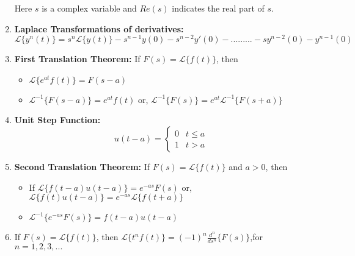 \documentclass[11pt,oneside,openright,numbers=noenddot]{scrbook}
\begin{document}
\begin{enumerate}
\begin{table}[ht!]
\begin{tabular}{|c|c|}
             \hline
        \end{tabular}
    \end{table}
    \FloatBarrier
    Here $s$ is a complex variable and $Re(s)$ indicates the real part of $s$. 
    \item \textbf{Laplace Transformations of derivatives:} 
    $$\mathcal{L} \{y^n(t)\}=s^n\mathcal{L} \{y(t)\}-s^{n-1}y(0)-s^{n-2}y'(0)- ......... -sy^{n-2}(0)-y^{n-1}(0)$$
    \item \textbf{First Translation Theorem:}
    If $F(s)=\mathcal{L} \{f(t)\}$, then
    \begin{itemize}
        \item $\displaystyle \mathcal{L} \{e^{at}f(t)\}=F(s-a)$
        \item $\displaystyle \mathcal{L}^{-1}\{F(s-a)\} =e^{at}f(t)$ \quad  or, \quad $\displaystyle \mathcal{L}^{-1}\{F(s)\} =e^{at}\mathcal{L}^{-1}\{F(s+a)\}$
    \end{itemize}
    \item \textbf{Unit Step Function:} $$u(t-a)=\begin{cases}
        0 & t \leq a\\
        1 & t>a
    \end{cases}$$
    \item \textbf{Second Translation Theorem:} If $F(s)=\mathcal{L} \{f(t)\}$ and $a>0$, then
    \begin{itemize}
        \item If $\displaystyle \mathcal{L} \{f(t-a)u(t-a)\}=e^{-as}F(s)$ 
        \quad or, \quad $\displaystyle \mathcal{L} \{f(t)u(t-a)\}=e^{-as}\mathcal{L} \{f(t+a)\}$
        \item $\displaystyle \mathcal{L}^{-1} \{e^{-as}F(s)\}=f(t-a)u(t-a)$
    \end{itemize}
    \item If $F(s)=\mathcal{L} \{f(t)\}$, then $\displaystyle \mathcal{L} \{t^n f(t)\}=(-1)^n \frac{d^n}{ds^n}\{F(s)\}$,\quad \quad for $n=1,2,3,...$
\end{enumerate}
\end{document}
